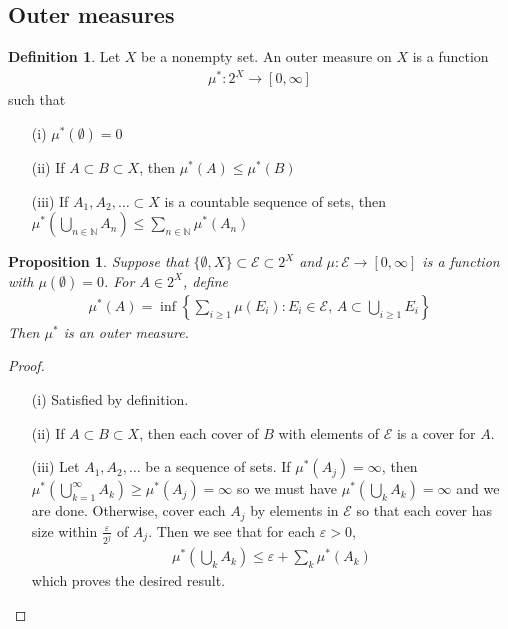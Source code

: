 \documentclass[11pt]{amsart}
\newtheorem{proposition}[theorem]{Proposition}
\theoremstyle{definition}
\newtheorem{definition}[theorem]{Definition}
\numberwithin{equation}{section}
\begin{document}
\subsection{Outer measures}
\begin{definition}
    Let $X$ be a nonempty set. An outer measure on $X$ is a function
    \begin{align*}
        \mu^*:2^X\to[0,\infty]
    \end{align*}
    such that
    \begin{enumerate}
        \item [(i)] $\mu^*(\emptyset)=0$
        \item [(ii)] If $A\subset B\subset X$, then $\mu^*(A)\le\mu^*(B)$
        \item [(iii)] If $A_1,A_2,\ldots\subset X$ is a countable sequence of sets, then $\mu^*(\bigcup_{n\in\mathbb N}A_n)\le\sum_{n\in \mathbb N}\mu^*(A_n)$
    \end{enumerate}
\end{definition}
\begin{proposition}
    Suppose that $\{\emptyset, X\}\subset \mathcal E\subset 2^X$ and $\mu:\mathcal E\to[0,\infty]$ is a function with $\mu(\emptyset)=0$. For $A\in 2^X$, define 
    \begin{align*}
        \mu^*(A)=\inf\left\{\sum_{i\ge 1}\mu(E_i):E_i\in\mathcal E,\,A\subset \bigcup_{i\ge 1}E_i\right\}
    \end{align*}
    Then $\mu^*$ is an outer measure.
\end{proposition}
\begin{proof}
    \begin{enumerate}
        \item [(i)] Satisfied by definition.
        \item [(ii)] If $A\subset B\subset X$, then each cover of $B$ with elements of $\mathcal E$ is a cover for $A$.
        \item [(iii)] Let $A_1,A_2,\ldots$ be a sequence of sets. If $\mu^*(A_j)=\infty$, then $\mu^*(\bigcup_{k=1}^\infty A_k)\ge\mu^*(A_j)=\infty$ so we must have $\mu^*(\bigcup_kA_k)=\infty$ and we are done. Otherwise, cover each $A_j$ by elements in $\mathcal E$ so that each cover has size within $\frac{\varepsilon}{2^j}$ of $A_j$. Then we see that for each $\varepsilon>0$, 
        \begin{align*}
            \mu^*(\bigcup_{k}A_k)\le\varepsilon+\sum_k\mu^*(A_k)
        \end{align*}
        which proves the desired result.
    \end{enumerate}
\end{proof}
\end{document}
